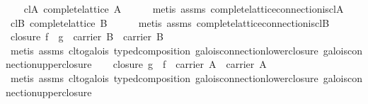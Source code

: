 \begin{isabellebody}
\isanewline
\ \ \isamarkupfalse%
\ cl{}A{}\ {}complete{}lattice\ A{}\isanewline
\ \ \ \ \isamarkupfalse%
\ {}metis\ assms\ complete{}lattice{}connection{}is{}cl{}A{}\isanewline
\isanewline
\ \ \isamarkupfalse%
\ cl{}B{}\ {}complete{}lattice\ B{}\isanewline
\ \ \ \ \isamarkupfalse%
\ {}metis\ assms\ complete{}lattice{}connection{}is{}cl{}B{}\isanewline
\isanewline
\ \ \isamarkupfalse%
\ closure{}{}\ {}f\ {}\ g\ {}\ carrier\ B\ {}\ carrier\ B{}\isanewline
\ \ \ \ \isamarkupfalse%
\ {}metis\ assms\ cl{}to{}galois\ typed{}composition\ galois{}connection{}lower{}closure\ galois{}connection{}upper{}closure{}\isanewline
\isanewline
\ \ \isamarkupfalse%
\ closure{}{}\ {}g\ {}\ f\ {}\ carrier\ A\ {}\ carrier\ A{}\isanewline
\ \ \ \ \isamarkupfalse%
\ {}metis\ assms\ cl{}to{}galois\ typed{}composition\ galois{}connection{}lower{}closure\ galois{}connection{}upper{}closure{}\isanewline

\end{isabellebody}
